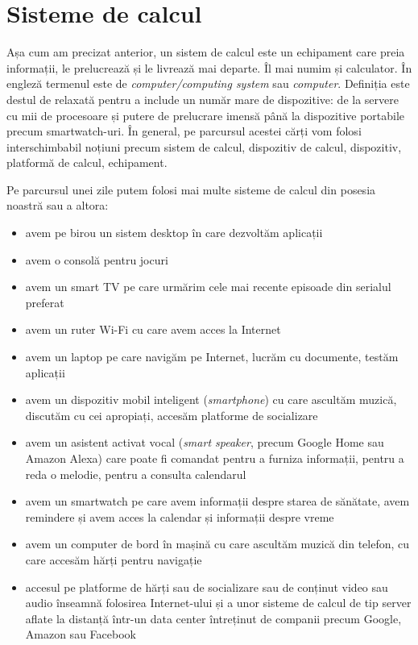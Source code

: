 \section{Sisteme de calcul}
\label{sec:intro:computer-systems}

Așa cum am precizat anterior, un sistem de calcul este un echipament care preia informații, le prelucrează și le livrează mai departe.
Îl mai numim și calculator.
În engleză termenul este de \textit{computer/computing system} sau \textit{computer}.
Definiția este destul de relaxată pentru a include un număr mare de dispozitive: de la servere cu mii de procesoare și putere de prelucrare imensă până la dispozitive portabile precum smartwatch-uri.
În general, pe parcursul acestei cărți vom folosi interschimbabil noțiuni precum sistem de calcul, dispozitiv de calcul, dispozitiv, platformă de calcul, echipament.

Pe parcursul unei zile putem folosi mai multe sisteme de calcul din posesia noastră sau a altora:

\begin{itemize}
  \item avem pe birou un sistem desktop în care dezvoltăm aplicații
  \item avem o consolă pentru jocuri
  \item avem un smart TV pe care urmărim cele mai recente episoade din serialul preferat
  \item avem un ruter Wi-Fi cu care avem acces la Internet
  \item avem un laptop pe care navigăm pe Internet, lucrăm cu documente, testăm aplicații
  \item avem un dispozitiv mobil inteligent (\textit{smartphone}) cu care ascultăm muzică, discutăm cu cei apropiați, accesăm platforme de socializare
  \item avem un asistent activat vocal (\textit{smart speaker}, precum Google Home sau Amazon Alexa) care poate fi comandat pentru a furniza informații, pentru a reda o melodie, pentru a consulta calendarul
  \item avem un smartwatch pe care avem informații despre starea de sănătate, avem remindere și avem acces la calendar și informații despre vreme
  \item avem un computer de bord în mașină cu care ascultăm muzică din telefon, cu care accesăm hărți pentru navigație
  \item accesul pe platforme de hărți sau de socializare sau de conținut video sau audio înseamnă folosirea Internet-ului și a unor sisteme de calcul de tip server aflate la distanță într-un data center întreținut de companii precum Google, Amazon sau Facebook
\end{itemize}

